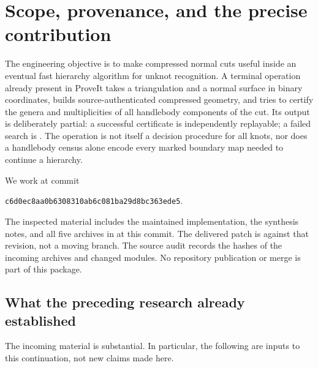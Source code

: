 \section{Scope, provenance, and the precise contribution}
\label{sec:scope}

The engineering objective is to make compressed normal cuts useful inside
an eventual fast hierarchy algorithm for unknot recognition.  A terminal
operation already present in ProveIt takes a triangulation and a normal
surface in binary coordinates, builds source-authenticated compressed
geometry, and tries to certify the genera and multiplicities of all
handlebody components of the cut.  Its output is deliberately partial:
a successful certificate is independently replayable; a failed search is
.  The operation is not itself a decision procedure for
all knots, nor does a handlebody census alone encode every marked boundary
map needed to continue a hierarchy.

We work at commit
\begin{center}\small
\texttt{c6d0ec8aa0b6308310ab6c081ba29d8bc363ede5}.
\end{center}
The inspected material includes the maintained  implementation,
the synthesis notes, and all five archives in  at this
commit.  The delivered patch is against that revision, not a moving branch.
The source audit records the hashes of the incoming archives and changed
modules.  No repository publication or merge is part of this package.

\subsection{What the preceding research already established}

The incoming material is substantial.  In particular, the following are
inputs to this continuation, not new claims made here.

